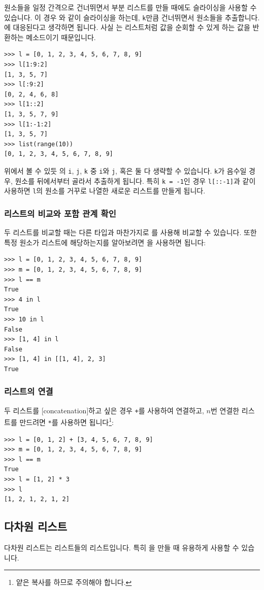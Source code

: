 \documentclass[../main.tex]{subfiles}
\begin{document}
원소들을 일정 간격으로 건너뛰면서 부분 리스트를 만들 때에도 슬라이싱을 사용할 수 있습니다.
이 경우 와 같이 슬라이싱을 하는데, \texttt{k}만큼 건너뛰면서 원소들을 추출합니다.
에 대응된다고 생각하면 됩니다.
사실 는 리스트처럼 값을 순회할 수 있게 하는 값을 반환하는 메소드이기 때문입니다.
\begin{verbatim}
>>> l = [0, 1, 2, 3, 4, 5, 6, 7, 8, 9]
>>> l[1:9:2]
[1, 3, 5, 7]
>>> l[:9:2]
[0, 2, 4, 6, 8]
>>> l[1::2]
[1, 3, 5, 7, 9]
>>> l[1:-1:2]
[1, 3, 5, 7]
>>> list(range(10))
[0, 1, 2, 3, 4, 5, 6, 7, 8, 9]
\end{verbatim}
위에서 볼 수 있듯 의 \texttt{i}, \texttt{j}, \texttt{k} 중 \texttt{i}와 \texttt{j}, 혹은 둘 다 생략할 수 있습니다.
\texttt{k}가 음수일 경우, 원소를 뒤에서부터 골라서 추출하게 됩니다.
특히 \texttt{k = -1}인 경우 \texttt{l[::-1]}과 같이 사용하면 \texttt{l}의 원소를 거꾸로 나열한 새로운 리스트를 만들게 됩니다.

\subsubsection{리스트의 비교와 포함 관계 확인}
두 리스트를 비교할 때는 다른 타입과 마찬가지로 \pyin{==}를 사용해 비교할 수 있습니다.
또한 특정 원소가 리스트에 해당하는지를 알아보려면 을 사용하면 됩니다:
\begin{verbatim}
>>> l = [0, 1, 2, 3, 4, 5, 6, 7, 8, 9]
>>> m = [0, 1, 2, 3, 4, 5, 6, 7, 8, 9]
>>> l == m
True
>>> 4 in l
True
>>> 10 in l
False
>>> [1, 4] in l
False
>>> [1, 4] in [[1, 4], 2, 3]
True
\end{verbatim}

\subsubsection{리스트의 연결}
두 리스트를 [concatenation]하고 싶은 경우 \texttt{+}를 사용하여 연결하고, $n$번 연결한 리스트를 만드려면 \texttt{*}를 사용하면 됩니다\footnote{얕은 복사를 하므로 주의해야 합니다.}:
\begin{verbatim}
>>> l = [0, 1, 2] + [3, 4, 5, 6, 7, 8, 9]
>>> m = [0, 1, 2, 3, 4, 5, 6, 7, 8, 9]
>>> l == m
True
>>> l = [1, 2] * 3
>>> l
[1, 2, 1, 2, 1, 2]
\end{verbatim}

\subsection{다차원 리스트}
다차원 리스트는 리스트들의 리스트입니다.
특히 을 만들 때 유용하게 사용할 수 있습니다.
\end{document}
